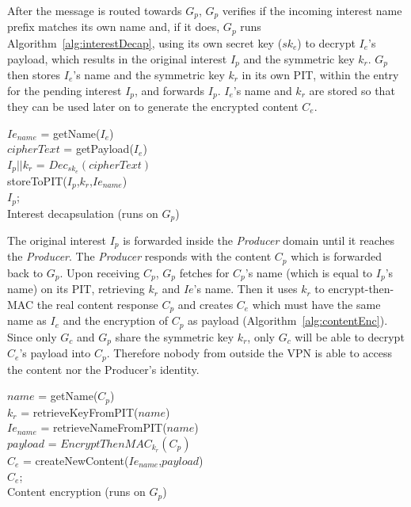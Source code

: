 After the message is routed towards $G_p$, $G_p$ verifies if the incoming interest name prefix matches its own name and, if it does, $G_p$ runs Algorithm~\ref{alg:interestDecap}, using its own secret key ($sk_e$) to decrypt $I_e$'s payload, which results in the original interest $I_p$ and the symmetric key $k_r$. $G_p$ then stores $I_e$'s name and the symmetric key $k_r$ in its own PIT, within the entry for the pending interest $I_p$, and forwards $I_p$. $I_e$'s name and $k_r$ are stored so that they can be used later on to generate the encrypted content $C_e$.

\begin{algorithm}\label{alg:interestDecap}
$Ie_{name}$ = getName($I_e$)\\
$cipherText$ = getPayload($I_e$)\\
$I_p||k_r$ = $Dec_{sk_e}(cipherText)$\\
storeToPIT($I_p$,$k_r$,$Ie_{name}$)\\
\Return $I_p$;\\
\caption{Interest decapsulation (runs on $G_p$)}
\end{algorithm}

The original interest $I_p$ is forwarded inside the \textit{Producer} domain until it reaches the \textit{Producer}. The \textit{Producer} responds with the content $C_p$ which is forwarded back to $G_p$.
Upon receiving $C_p$, $G_p$ fetches for $C_p$'s name (which is equal to $I_p$'s name) on its PIT, retrieving $k_r$ and $Ie$'s name. Then it uses $k_r$ to encrypt-then-MAC the real content response $C_p$ and creates $C_e$ which must have the same name as $I_e$ and the encryption of $C_p$ as payload (Algorithm~\ref{alg:contentEnc}). Since only $G_c$ and $G_p$ share the symmetric key $k_r$, only $G_c$ will be able to decrypt $C_e$'s payload into $C_p$. Therefore nobody from outside the VPN is able to access the content nor the Producer's identity.

\begin{algorithm}\label{alg:contentEnc}
$name$ = getName($C_p$)\\
$k_r$ = retrieveKeyFromPIT($name$)\\
$Ie_{name}$ = retrieveNameFromPIT($name$)\\
$payload$ = $EncryptThenMAC_{k_r}(C_p)$\\
$C_e$ = createNewContent($Ie_{name}$,$payload$)\\
\Return $C_e$;\\
\caption{Content encryption  (runs on $G_p$)}
\end{algorithm}

